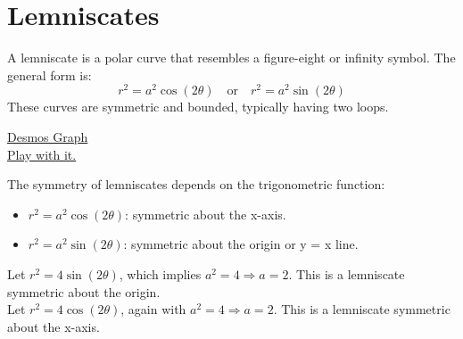 \section{Lemniscates}
\label{sec:lemniscates}

\begin{definition}
  A lemniscate is a polar curve that resembles a figure-eight or infinity
  symbol. The general form is:
  \[
    r^2 = a^2 \cos(2\theta) \quad \text{or} \quad r^2 = a^2 \sin(2\theta)
  \]
  These curves are symmetric and bounded, typically having two loops.

  \href{https://www.desmos.com/calculator/blv5epd0gc}{Desmos Graph}\\
  \href{https://www.geogebra.org/m/Z9T8AUBe}{Play with it.}
\end{definition}

\begin{remark}
  The symmetry of lemniscates depends on the trigonometric function:
  \begin{itemize}
    \item \( r^2 = a^2 \cos(2\theta) \): symmetric about the x-axis.
    \item \( r^2 = a^2 \sin(2\theta) \): symmetric about the origin or y = x
      line.
  \end{itemize}
\end{remark}

\begin{eg}
  Let \( r^2 = 4\sin(2\theta) \), which implies \( a^2 = 4 \Rightarrow a = 2 \).
  This is a lemniscate symmetric about the origin.\\

  Let \( r^2 = 4\cos(2\theta) \), again with \( a^2 = 4 \Rightarrow a = 2 \).
  This is a lemniscate symmetric about the x-axis.
\end{eg}
